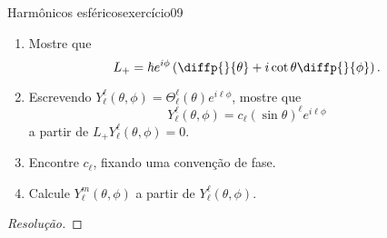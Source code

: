 \begin{exercício}{Harmônicos esféricos}{exercício09}
    \begin{enumerate}[label=(\alph*)]
        \item Mostre que
            \begin{equation*}
                L_+ = \hbar e^{i\phi} \left(\diffp{}{\theta} + i \cot\theta\diffp{}{\phi}\right).
            \end{equation*}
        \item Escrevendo \(Y_\ell^\ell(\theta, \phi) = \Theta_\ell^\ell(\theta)e^{i\ell \phi}\), mostre que
            \begin{equation*}
                Y_\ell^\ell(\theta,\phi) = c_\ell (\sin \theta)^\ell e^{i\ell \phi}
            \end{equation*}
            a partir de \(L_+Y_\ell^\ell(\theta,\phi) = 0\).
        \item Encontre \(c_\ell\), fixando uma convenção de fase.
        \item Calcule \(Y_\ell^m(\theta,\phi)\) a partir de \(Y_\ell^\ell(\theta,\phi)\).
    \end{enumerate}
\end{exercício}
\begin{proof}[Resolução]

\end{proof}
